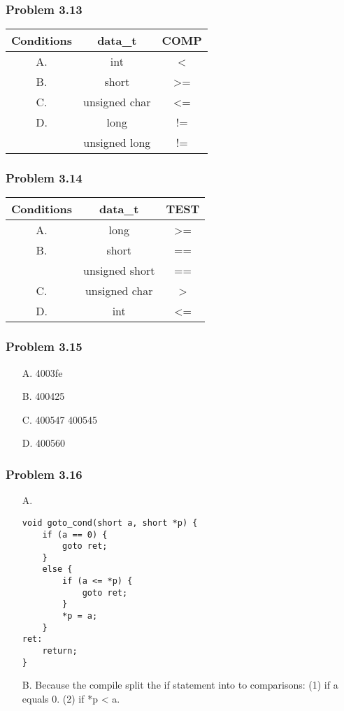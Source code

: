 \documentclass[a4paper]{article}
\begin{document}
\subsubsection*{Problem 3.13}
\begin{tabular}{ccc}
    Conditions&data\_t&COMP\\\hline
    A.&int&<\\
    B.&short&>=\\
    C.&unsigned char&<=\\
    D.&long&!=\\
    &unsigned long&!=
\end{tabular}

\subsubsection*{Problem 3.14}
\begin{tabular}{ccc}
    Conditions&data\_t&TEST\\\hline
    A.&long&>=\\
    B.&short&==\\
    &unsigned short&==\\
    C.&unsigned char&>\\
    D.&int&<=
\end{tabular}

\subsubsection*{Problem 3.15}
\begin{enumerate}
    \item[A.] 4003fe
    \item[B.] 400425
    \item[C.] 400547 400545
    \item[D.] 400560
\end{enumerate}

\subsubsection*{Problem 3.16}
\begin{enumerate}
    \item[A.]
\begin{lstlisting}
void goto_cond(short a, short *p) {
    if (a == 0) {
        goto ret;
    }
    else {
        if (a <= *p) {
            goto ret;
        }
        *p = a;
    }
ret:
    return;
}
\end{lstlisting} 
    \item[B.] Because the compile split the if statement into to comparisons: (1) if a equals 0. (2) if *p < a. 
\end{enumerate}
\end{document}
